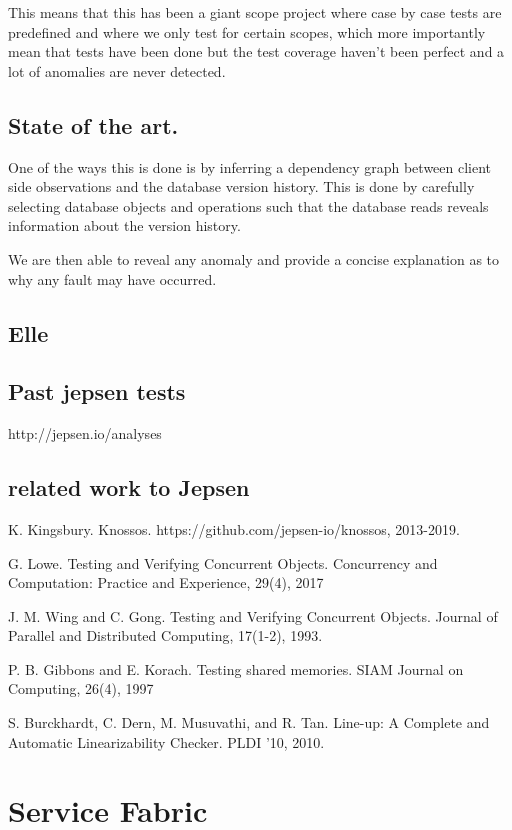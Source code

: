 \documentclass[
  a4paper,  %
  twoside,  %
  bibliography=totoc,
  headsepline,
  cleardoublepage=empty,
  parskip=half,
  draft=false
]{scrbook}
\begin{document}
This means that this has been a giant scope project where case by case tests are predefined and where we only test for certain scopes, which more importantly mean that tests have been done but the test coverage haven't been perfect and a lot of anomalies are never detected.

\subsection{State of the art.}

One of the ways this is done is by inferring a dependency graph between client side observations and the database version history. This is done by carefully selecting database objects and operations such that the database reads reveals information about the version history. 

We are then able to reveal any anomaly and provide a concise explanation as to why any fault may have occurred.  




\subsection{Elle}


\subsection{Past jepsen tests}

http://jepsen.io/analyses


\subsection{related work to Jepsen}


K. Kingsbury. Knossos.
https://github.com/jepsen-io/knossos, 2013-2019.

G. Lowe. Testing and Verifying Concurrent Objects.
Concurrency and Computation: Practice and
Experience, 29(4), 2017

J. M. Wing and C. Gong. Testing and Verifying
Concurrent Objects. Journal of Parallel and
Distributed Computing, 17(1-2), 1993.

P. B. Gibbons and E. Korach. Testing shared
memories. SIAM Journal on Computing, 26(4), 1997

S. Burckhardt, C. Dern, M. Musuvathi, and R. Tan.
Line-up: A Complete and Automatic Linearizability
Checker. PLDI ’10, 2010.


\section{Service Fabric}
\end{document}
